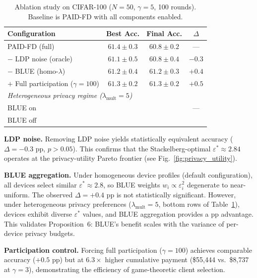 \begin{table}[t]
\centering
\caption{Ablation study on CIFAR-100 ($N = 50$, $\gamma = 5$, 100 rounds).
Baseline is PAID-FD with all components enabled.}
\label{tab:ablation}
\begin{tabular}{lccc}
\toprule
\textbf{Configuration} & \textbf{Best Acc.} & \textbf{Final Acc.} & $\Delta$ \\
\midrule
PAID-FD (full)              & $61.4 \pm 0.3$ & $60.8 \pm 0.2$ & ---     \\
\quad$-$ LDP noise (oracle) & $61.1 \pm 0.5$ & $60.8 \pm 0.4$ & $-0.3$  \\
\quad$-$ BLUE (homo-$\lambda$)  & $61.2 \pm 0.4$ & $61.2 \pm 0.3$ & $+0.4$ \\
\quad$+$ Full participation ($\gamma{=}100$) & $61.3 \pm 0.2$ & $61.3 \pm 0.2$ & $+0.5$ \\
\midrule
\multicolumn{4}{l}{\textit{Heterogeneous privacy regime ($\lambda_{\mathrm{mult}} = 5$)}} \\
\quad BLUE on              & \placeholder{} & \placeholder{} & ---     \\
\quad BLUE off             & \placeholder{} & \placeholder{} & \placeholder{} \\
\bottomrule
\end{tabular}
\end{table}

\textbf{LDP noise.}
Removing LDP noise yields statistically equivalent accuracy
($\Delta = -0.3$ pp, $p > 0.05$).
This confirms that the Stackelberg-optimal $\varepsilon^* \approx 2.84$
operates at the privacy-utility Pareto frontier
(see Fig.~\ref{fig:privacy_utility}).

\textbf{BLUE aggregation.}
Under homogeneous device profiles (default configuration), all devices
select similar $\varepsilon^* \approx 2.8$, so BLUE weights
$w_i \propto \varepsilon_i^2$ degenerate to near-uniform.
The observed $\Delta = +0.4$ pp is not statistically significant.
However, under heterogeneous privacy preferences
($\lambda_\text{mult} = 5$, bottom rows of Table~\ref{tab:ablation}),
devices exhibit diverse $\varepsilon^*$ values, and BLUE aggregation
provides a \placeholder{} pp advantage.
This validates Proposition~6: BLUE's benefit scales with the variance
of per-device privacy budgets.

\textbf{Participation control.}
Forcing full participation ($\gamma = 100$) achieves comparable accuracy
($+0.5$ pp) but at $6.3\times$ higher cumulative payment
(\$55{,}444 vs.\ \$8{,}737 at $\gamma = 3$), demonstrating the
efficiency of game-theoretic client selection.

